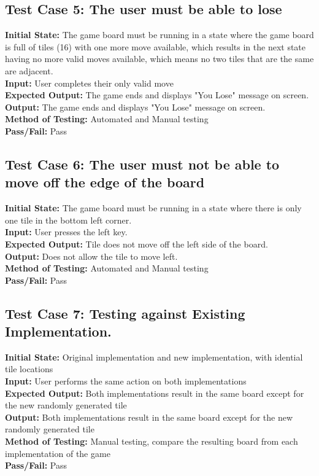 \documentclass[12pt]{article}
\begin{document}
\subsection{Test Case 5: The user must be able to lose}

\textbf{Initial State:} The game board must be running in a state where the game board is full of tiles (16) with one more move available, which results in the next state having no more valid moves available, which means no two tiles that are the same are adjacent.\\
\textbf{Input:} User completes their only valid move\\
\textbf{Expected Output:} The game ends and displays "You Lose" message on screen.\\
\textbf{Output:} The game ends and displays "You Lose" message on screen.\\
\textbf{Method of Testing:} Automated and Manual testing\\
\textbf{Pass/Fail:} Pass

\subsection{Test Case 6: The user must not be able to move off the edge of the board}

\textbf{Initial State:} The game board must be running in a state where there is only one tile in the bottom left corner.\\
\textbf{Input:} User presses the left key.\\
\textbf{Expected Output:} Tile does not move off the left side of the board.\\
\textbf{Output:} Does not allow the tile to move left.\\
\textbf{Method of Testing:} Automated and Manual testing\\
\textbf{Pass/Fail:} Pass

\subsection{Test Case 7: Testing against Existing Implementation.}
\textbf{Initial State:} Original implementation and new implementation, with idential tile locations\\
\textbf{Input:} User performs the same action on both implementations\\
\textbf{Expected Output:} Both implementations result in the same board except for the new randomly generated tile\\
\textbf{Output:} Both implementations result in the same board except for the new randomly generated tile\\
\textbf{Method of Testing:} Manual testing, compare the resulting board from each implementation of the game\\
\textbf{Pass/Fail:} Pass
\end{document}
